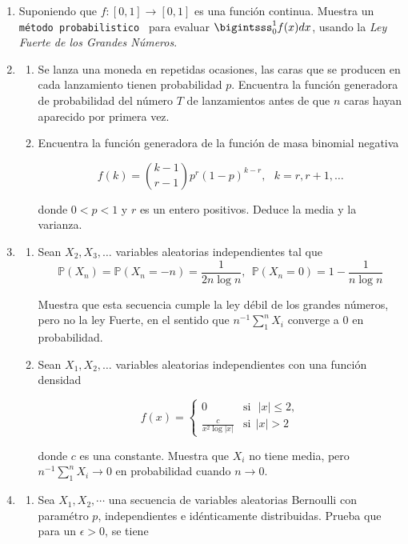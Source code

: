 \documentclass[a4paper,11pt]{report}
\newcommand{\PR}{\mathbb{P}}
\begin{document}
\begin{enumerate}
\item Suponiendo que $f:[0,1] \rightarrow [0,1]$ es una funci\'on continua. Muestra un \texttt{m\'etodo probabilistico } para evaluar $\bigintsss_{0}^{1}f(x) dx$, usando la \textit{Ley Fuerte de los Grandes N\'umeros}.

\item 

\begin{enumerate}
	\item Se lanza una moneda en repetidas ocasiones, las caras  que se producen en cada lanzamiento tienen probabilidad $p$. Encuentra la funci\'on generadora  de probabilidad del n\'umero $T$ de lanzamientos antes de que $n$ caras  hayan  aparecido por primera vez.
	\item Encuentra la funci\'on generadora de la funci\'on de masa binomial negativa
	
	\[
	f(k) = \binom{k - 1}{r - 1}p^r(1 - p)^{k - r}, \ \  \ k = r, r + 1, \dots
	\]
	
	donde $0 < p < 1$ y $r$ es un entero positivos. Deduce la media y la varianza.
\end{enumerate}
\item 
\begin{enumerate}
	\item Sean $X_2, X_3, \dots $ variables aleatorias independientes tal que
	\[
	\PR(X_n) = \PR(X_n = -n) = \frac{1}{2n \log n},\ \ \PR(X_n = 0) = 1 - \frac{1}{n\log n}
	\]
	
	Muestra que esta secuencia cumple la ley d\'ebil de los grandes n\'umeros, pero no la ley Fuerte, en el sentido  que $n^{-1}\sum_{1}^{n}X_i$ converge a $0$ en probabilidad.
	\item Sean $X_1, X_2, \dots $ variables aleatorias independientes con una funci\'on densidad
	
	\[
	f(x) = \begin{cases}
	0 & \text{si}\ \ \ \vert x \vert \leq 2,\\
	\frac{c}{x^2\log \vert x \vert } & \text{si}\ \ \vert x \vert > 2
	\end{cases}
	\]
	
	donde $c$ es una constante. Muestra que $X_i$ no tiene media, pero $n^{-1}\sum_{1}^{n}X_i \rightarrow 0$ en probabilidad cuando $n \rightarrow 0$.
\end{enumerate}

\item 

\begin{enumerate}
	\item Sea $X_1, X_2, \cdots $ una secuencia de variables aleatorias Bernoulli con param\'etro $p$, independientes e id\'enticamente distribuidas. Prueba que para un $\epsilon > 0$, se tiene
	

\end{enumerate}
\end{enumerate}
\end{document}
